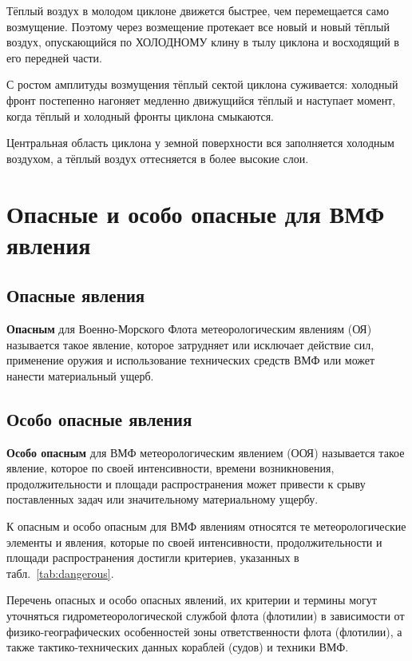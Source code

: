 \documentclass[a4paper, 12pt, twoside, final, book, russian, fittopage, cyremdash, openright]{ncc}
\begin{document}
Тёплый воздух в молодом циклоне движется быстрее, чем перемещается
само возмущение. Поэтому через возмещение протекает все новый и новый
тёплый воздух, опускающийся по ХОЛОДНОМУ клину в тылу циклона и
восходящий в его передней части.

С ростом амплитуды возмущения тёплый сектой циклона суживается:
холодный фронт постепенно нагоняет медленно движущийся тёплый и
наступает момент, когда тёплый и холодный фронты циклона смыкаются.

Центральная область циклона у земной поверхности вся заполняется
холодным воздухом, а тёплый воздух оттесняется в более высокие слои.

\section{Опасные и особо опасные для ВМФ явления}
\label{sec:dangerous}

\subsection{Опасные явления}

\textbf{Опасным} для Военно-Морского Флота метеорологическим явлениям
(ОЯ) называется такое явление, которое затрудняет или исключает
действие сил, применение оружия и использование технических средств
ВМФ или может нанести материальный ущерб.

\subsection{Особо опасные явления}

\textbf{Особо опасным} для ВМФ метеорологическим явлением (ООЯ)
называется такое явление, которое по своей интенсивности, времени
возникновения, продолжительности и площади распространения может
привести к срыву поставленных задач или значительному материальному
ущербу.

К опасным и особо опасным для ВМФ явлениям относятся те
метеорологические элементы и явления, которые по своей интенсивности,
продолжительности и площади распространения достигли критериев,
указанных в табл.~\ref{tab:dangerous}.

Перечень опасных и особо опасных явлений, их критерии и термины могут
уточняться гидрометеорологической службой флота (флотилии) в
зависимости от физико-географических особенностей зоны ответственности
флота (флотилии), а также тактико-технических данных кораблей (судов)
и техники ВМФ.
\end{document}
